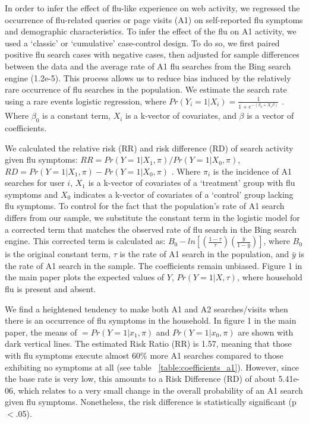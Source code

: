 \documentclass[12pt]{article}
\begin{document}
In order to infer the effect of flu-like experience on web activity, we regressed the occurrence of flu-related queries or page visits (A1) on self-reported flu symptoms and demographic characteristics. To infer the effect of the flu on A1 activity, we used a `classic' or `cumulative' case-control design. To do so, we first paired positive flu search cases with negative cases, then adjusted for sample differences between the data and the average rate of A1 flu searches from the Bing search engine (1.2e-5). This process allows us to reduce bias induced by the relatively rare occurrence of flu searches in the population. We estimate the search rate using a rare events logistic regression, where $Pr(Y_i=1|X_i) = \frac{1}{1+e^{ - (\beta_0 + X_i \beta ) }}$ . Where $\beta_0$ is a constant term, $X_i$ is a k-vector of covariates, and $\beta$ is a vector of coefficients. 

We calculated the relative risk (RR) and risk difference (RD) of search activity given flu symptoms: $ RR = Pr(Y=1|X_1, \pi) / Pr(Y=1|X_0, \pi) $, $ RD = Pr(Y=1|X_1, \pi) - Pr(Y=1|X_0, \pi) $ \citep{king_and_zeng_2001}. Where $\pi_i$ is the incidence of A1 searches for user $i$, $X_1$ is a k-vector of covariates of a `treatment' group with flu symptoms and $X_0$ indicates a k-vector of covariates of a `control' group lacking flu symptoms. To control for the fact that the population's rate of A1 search differs from our sample, we substitute the constant term in the logistic model for a corrected term that matches the observed rate of flu search in the Bing search engine. This corrected term is calculated as: $B_0 - ln[ (\frac{1-\tau}{\tau}) (\frac{\bar{y}}{1-\bar{y}}) ]$, where $B_0$ is the original constant term, $\tau$ is the rate of A1 search in the population, and $\bar{y}$ is the rate of A1 search in the sample. The coefficients remain unbiased. Figure 1 in the main paper plots the expected values of $Y$, $Pr(Y=1|X, \tau)$, where household flu is present and absent.



We find a heightened tendency to make both A1 and A2  searches/visits when there is an occurrence of flu symptoms in the household. In figure 1 in the main paper, the means of $ = Pr(Y=1|x_1, \pi)$ and $ Pr(Y=1|x_0, \pi) $ are shown with dark vertical lines. The estimated Risk Ratio (RR) is 1.57, meaning that those with flu symptoms execute almost 60\% more A1 searches compared to those exhibiting no symptoms at all (see table ~\ref{table:coefficients_a1}). However, since the base rate is very low, this amounts to a Risk Difference (RD) of about 5.41e-06, which relates to a very small change in the overall probability of an A1 search given flu symptoms. Nonetheless, the risk difference is statistically significant (p$<$.05). 
\end{document}
